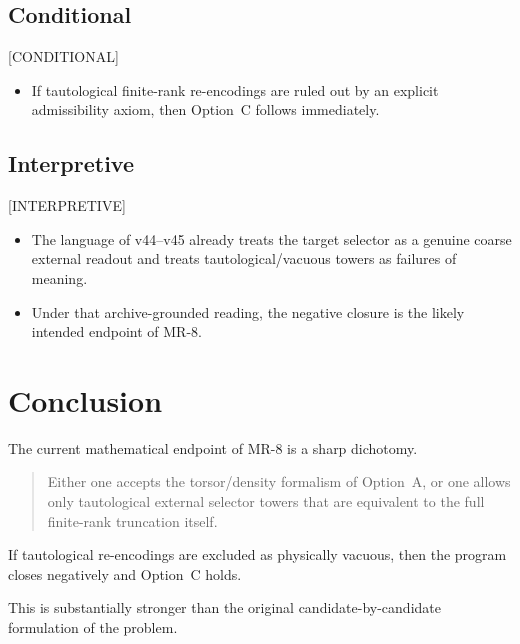 \documentclass[11pt,a4paper]{article}
\theoremstyle{definition}
\theoremstyle{remark}
\newcommand{\statuscond}{\textcolor{orange!80!black}{\textsf{[CONDITIONAL]}}}
\newcommand{\statusinterp}{\textcolor{blue!60!black}{\textsf{[INTERPRETIVE]}}}
\begin{document}
\subsection*{Conditional}
\statuscond
\begin{itemize}[leftmargin=2em]
  \item If tautological finite-rank re-encodings are ruled out by an
        explicit admissibility axiom, then Option~C follows immediately.
\end{itemize}

\subsection*{Interpretive}
\statusinterp
\begin{itemize}[leftmargin=2em]
  \item The language of v44--v45 already treats the target selector as a
        genuine coarse external readout and treats tautological/vacuous
        towers as failures of meaning.
  \item Under that archive-grounded reading, the negative closure is the
        likely intended endpoint of MR-8.
\end{itemize}

\section{Conclusion}

The current mathematical endpoint of MR-8 is a sharp dichotomy.

\begin{quote}
Either one accepts the torsor/density formalism of Option~A, or one
allows only tautological external selector towers that are equivalent to
the full finite-rank truncation itself.
\end{quote}

If tautological re-encodings are excluded as physically vacuous, then the
program closes negatively and Option~C holds.

This is substantially stronger than the original candidate-by-candidate
formulation of the problem.
\end{document}
